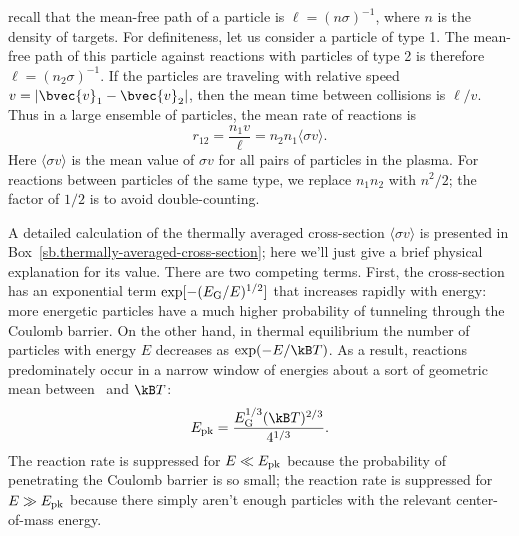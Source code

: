  recall that the mean-free path of a particle is $\ell = (n\sigma)^{-1}$, where $n$ is the density of targets. For definiteness, let us consider a particle of type 1. The mean-free path of this particle against reactions with particles of type 2 is therefore $\ell = (n_{2}\sigma)^{-1}$. If the particles are traveling with relative speed $v = |\bvec{v}_{1}-\bvec{v}_{2}|$, then the mean time between collisions is $\ell/v$. Thus in a large ensemble of particles, the mean rate of reactions is
\[
	r_{12} = \frac{n_{1} v}{\ell} = n_{2}n_{1}\langle\sigma v\rangle.
\]
Here $\langle \sigma v\rangle$ is the mean value of $\sigma v$ for all pairs of particles in the plasma.
For reactions between particles of the same type, we replace $n_{1}n_{2}$ with $n^{2}/2$; the factor of $1/2$ is to avoid double-counting.

A detailed calculation of the thermally averaged cross-section $\langle\sigma v\rangle$ is presented in Box~\ref{sb.thermally-averaged-cross-section}; here we'll just give a brief physical explanation for its value. There are two competing terms. First, the cross-section has an exponential term $\exp[-(E_{\mathrm{G}}/E)^{1/2}]$ that increases rapidly with energy: more energetic particles have a much higher probability of tunneling through the Coulomb barrier. On the other hand, in thermal equilibrium the number of particles with energy $E$ decreases as $\exp(-E/\kB T)$.
As a result, reactions predominately occur in a narrow window of energies about a sort of geometric mean between \EG\ and $\kB T$:
\[	\Epk = \frac{\EG^{1/3}(\kB T)^{2/3}}{4^{1/3}}. \]
The reaction rate is suppressed for $E\ll E_{\mathrm{pk}}$ because the probability of penetrating the Coulomb barrier is so small; the reaction rate is suppressed for $E\gg E_{\mathrm{pk}}$ because there simply aren't enough particles with the relevant center-of-mass energy.

